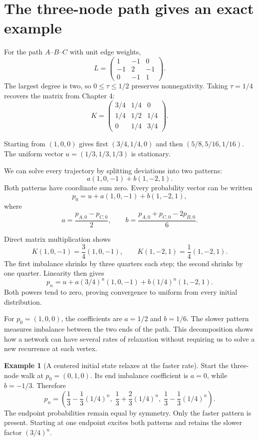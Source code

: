 \documentclass[11pt,oneside,openany]{book}
\theoremstyle{definition}
\newtheorem{example}{Example}[chapter]
\theoremstyle{remark}
\numberwithin{equation}{chapter}
\begin{document}
\section{The three-node path gives an exact example}\label{ch10-the-three-node-path-gives-an-exact-example}

For the path \(A\)--\(B\)--\(C\) with unit edge weights, \[L=\begin{pmatrix}1&-1&0\\-1&2&-1\\0&-1&1\end{pmatrix}.\] The largest degree is two, so \(0\leq\tau\leq1/2\) preserves nonnegativity. Taking \(\tau=1/4\) recovers the matrix from Chapter 4: \[K=\begin{pmatrix}3/4&1/4&0\\1/4&1/2&1/4\\0&1/4&3/4\end{pmatrix}.\]

Starting from \((1,0,0)\) gives first \((3/4,1/4,0)\) and then \((5/8,5/16,1/16)\). The uniform vector \(u=(1/3,1/3,1/3)\) is stationary.

We can solve every trajectory by splitting deviations into two patterns: \[a(1,0,-1)+b(1,-2,1).\] Both patterns have coordinate sum zero. Every probability vector can be written \[p_0=u+a(1,0,-1)+b(1,-2,1),\] where \[a=\frac{p_{A,0}-p_{C,0}}2,\qquad
b=\frac{p_{A,0}+p_{C,0}-2p_{B,0}}6.\]

Direct matrix multiplication shows \[K(1,0,-1)=\frac34(1,0,-1),\qquad
K(1,-2,1)=\frac14(1,-2,1).\] The first imbalance shrinks by three quarters each step; the second shrinks by one quarter. Linearity then gives \[\boxed{
p_n=u+a(3/4)^n(1,0,-1)+b(1/4)^n(1,-2,1).
}\] Both powers tend to zero, proving convergence to uniform from every initial distribution.

For \(p_0=(1,0,0)\), the coefficients are \(a=1/2\) and \(b=1/6\). The slower pattern measures imbalance between the two ends of the path. This decomposition shows how a network can have several rates of relaxation without requiring us to solve a new recurrence at each vertex.

\begin{example}[A centered initial state relaxes at the faster rate]

Start the three-node walk at \(p_0=(0,1,0)\). Its end imbalance coefficient is \(a=0\), while \(b=-1/3\). Therefore \[p_n=\left(\frac13-\frac13(1/4)^n,\;
\frac13+\frac23(1/4)^n,\;
\frac13-\frac13(1/4)^n\right).\] The endpoint probabilities remain equal by symmetry. Only the faster pattern is present. Starting at one endpoint excites both patterns and retains the slower factor \((3/4)^n\).

\end{example}
\end{document}
